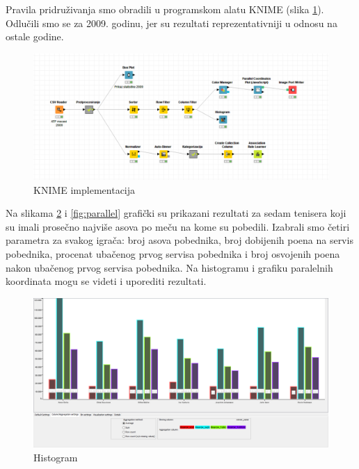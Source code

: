 \documentclass[a4paper]{article}
\begin{document}
Pravila pridruživanja smo obradili u programskom alatu KNIME (slika \ref{fig:knime}).
Odlučili smo se za 2009. godinu, jer su rezultati reprezentativniji u odnosu na ostale godine.

\begin{figure}[H]
	\begin{center}
		\includegraphics[scale=0.37]{KNIME_project/PravilaPridruzivanja/knime.png}
	\end{center}
	\caption{KNIME implementacija}
	\label{fig:knime}
\end{figure}

Na slikama \ref{fig:histogram} i \ref{fig:parallel} grafički su prikazani rezultati za sedam
tenisera koji su imali prosečno najviše asova po meču na kome su pobedili. Izabrali smo četiri parametra za svakog igrača:
broj asova pobednika, broj dobijenih poena na servis pobednika, procenat ubačenog prvog servisa pobednika i
broj osvojenih poena nakon ubačenog prvog servisa pobednika. Na histogramu i grafiku paralelnih koordinata 
mogu se videti i uporediti rezultati.

\begin{figure}[H]
	\begin{center}
		\includegraphics[scale=0.25]{KNIME_project/PravilaPridruzivanja/histogram2009}
	\end{center}
	\caption{Histogram}
	\label{fig:histogram}
\end{figure}
\end{document}
